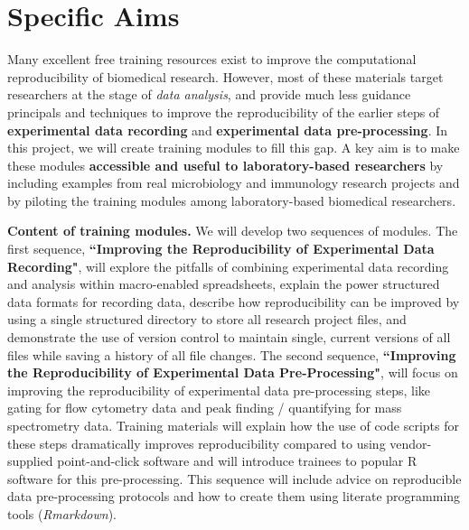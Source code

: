 \documentclass[pdftex,english,11.5pt,parskip=half]{scrartcl}
\begin{document}
\def\bf{\normalfont\bfseries}
\pagestyle{empty}

\section*{Specific Aims}
\begingroup
    \fontsize{11pt}{12pt}\selectfont 
    
Many excellent free training resources exist to improve the computational reproducibility of biomedical research. However, most of these materials target researchers at the stage of \textit{data analysis}, and provide much less guidance principals and techniques to improve the reproducibility of the earlier steps of \textbf{experimental data recording} and \textbf{experimental data pre-processing}. In this project, we will create training modules to fill this gap. A key aim is to make these modules \textbf{accessible and useful to laboratory-based researchers} by including examples from real microbiology and immunology research projects and by piloting the training modules among laboratory-based biomedical researchers.


\textbf{Content of training modules.} We will develop two sequences of modules. The first sequence, \textbf{``Improving the Reproducibility of Experimental Data Recording"}, will explore the pitfalls of combining experimental data recording and analysis within macro-enabled spreadsheets, explain the power structured data formats for recording data, describe how reproducibility can be improved by using a single structured directory to store all research project files, and demonstrate the use of version control to maintain single, current versions of all files while saving a history of all file changes. The second sequence, \textbf{``Improving the Reproducibility of Experimental Data Pre-Processing"}, will focus on improving the reproducibility of experimental data pre-processing steps, like gating for flow cytometry data and peak finding / quantifying for mass spectrometry data. Training materials will explain how the use of code scripts for these steps dramatically improves reproducibility compared to using vendor-supplied point-and-click software and will introduce trainees to popular R software for this pre-processing. This sequence will include advice on reproducible data pre-processing protocols and how to create them using literate programming tools (\textit{Rmarkdown}). 
\end{document}
